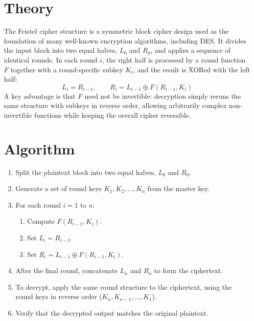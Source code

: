 \section{Theory}
The Feistel cipher structure is a symmetric block cipher design used as the
foundation of many well-known encryption algorithms, including DES. It
divides the input block into two equal halves, $L_0$ and $R_0$, and applies
a sequence of identical rounds. In each round $i$, the right half is
processed by a round function $F$ together with a round-specific subkey
$K_i$, and the result is XORed with the left half:
\[
L_i = R_{i-1}, \qquad R_i = L_{i-1} \oplus F(R_{i-1}, K_i)
\]
A key advantage is that $F$ need not be invertible: decryption simply reruns the same structure with subkeys in reverse order, allowing arbitrarily complex non-invertible functions while keeping the overall cipher reversible.

\section{Algorithm}
\begin{enumerate}
  \item Split the plaintext block into two equal halves, $L_0$ and $R_0$.
  \item Generate a set of round keys $K_1, K_2, \dots, K_n$ from the master key.
  \item For each round $i = 1$ to $n$:
  \begin{enumerate}
    \item Compute $F(R_{i-1}, K_i)$.
    \item Set $L_i = R_{i-1}$.
    \item Set $R_i = L_{i-1} \oplus F(R_{i-1}, K_i)$.
  \end{enumerate}
  \item After the final round, concatenate $L_n$ and $R_n$ to form the ciphertext.
  \item To decrypt, apply the same round structure to the ciphertext, using
        the round keys in reverse order ($K_n, K_{n-1}, \dots, K_1$).
  \item Verify that the decrypted output matches the original plaintext.
\end{enumerate}

